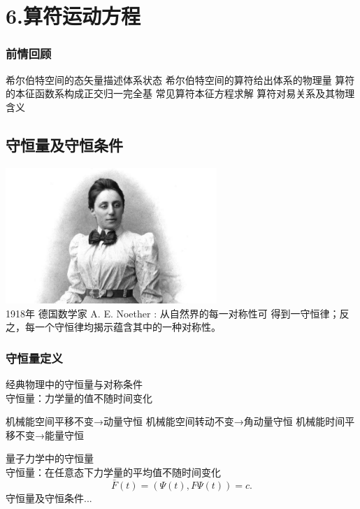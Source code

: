 

\section{6.算符运动方程}

\begin{frame}
    \frametitle{前情回顾}
    \begin{itemize}
        \Item 希尔伯特空间的态矢量描述体系状态
        \Item 希尔伯特空间的算符给出体系的物理量
        \Item 算符的本征函数系构成正交归一完全基
        \Item 常见算符本征方程求解
        \Item 算符对易关系及其物理含义 
    \end{itemize}   
\end{frame} 

\subsection{守恒量及守恒条件}

\begin{frame}
\includegraphics[width=0.6\textwidth]{figs/2021-12-17-21-25-13.png} \\
1918年 德国数学家 A. E. Noether : 从自然界的每一对称性可
得到一守恒律；反之，每一个守恒律均揭示蕴含其中的一种对称性。
\end{frame} 

\begin{frame} 
    \frametitle{守恒量定义}
    \begin{enumerate}
        \Item  经典物理中的守恒量与对称条件\\
                守恒量：力学量的值不随时间变化\\
                \begin{itemize}
                    \Item 机械能空间平移不变→动量守恒
                    \Item 机械能空间转动不变→角动量守恒
                    \Item 机械能时间平移不变→能量守恒
                \end{itemize}
        \Item  量子力学中的守恒量\\
                守恒量：在任意态下力学量的平均值不随时间变化\\
                $$ \bar{F}(t)=(\Psi(t), F\Psi(t)) =c.  $$
                守恒量及守恒条件... 
    \end{enumerate}
\end{frame} 

